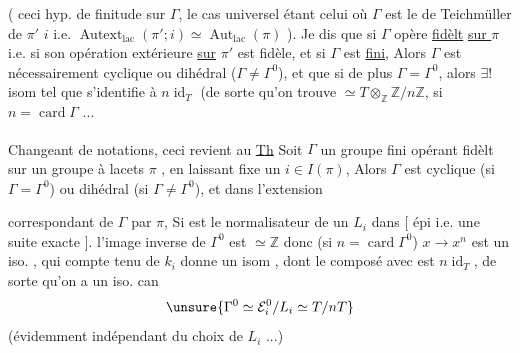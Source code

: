 ( ceci   hyp. de finitude sur
$\Gamma$, le cas universel étant celui où $\Gamma$
est le  de Teichmüller de $\pi'$  $i$
i.e. $\operatorname{Autext}_{\mathrm{lac}}(\pi';i)\simeq\operatorname{Aut}_{\mathrm{lac}}(\pi)$ ). Je
dis que si $\Gamma$ opère \uline{fidèlt} \uline{sur $\pi$}
i.e. si son opération extérieure \uline{sur}
\uline{$\pi'$} est fidèle, et si $\Gamma$ est \uline{fini},
Alors $\Gamma$ est nécessairement cyclique 
ou dihédral ($\Gamma\ne\Gamma^0$), et que si de
plus $\Gamma=\Gamma^0$, alors   $\exists!$ isom
 tel que  s'identifie à
$n\operatorname{id}_T$ (de sorte qu'on trouve 
$\simeq T\otimes_{\mathbb Z}\mathbb Z/n\mathbb Z$, si $n=\operatorname{card}\Gamma$ ...

Changeant de notations, ceci revient au
\uline{Th}\textsuperscript{} Soit $\Gamma$ un groupe fini opérant
fidèlt sur un groupe \uline{} à
lacets $\pi$ , en laissant fixe un $i\in I(\pi)$,
Alors $\Gamma$ est cyclique (si $\Gamma=\Gamma^0$) ou
dihédral (si $\Gamma\ne\Gamma^0$), et dans l'extension


correspondant   de $\Gamma$ par $\pi$,
Si  est le normalisateur de un $L_i$ dans
 [    épi i.e. une suite exacte
 ]. l'image inverse  de
$\Gamma^0$ est $\simeq\mathbb Z$ donc (si $n=\operatorname{card}\Gamma^0$)\inserted{\unsure{$=[\mathcal E_i^0:L_i]$}}
 $x\to x^n$ est un iso.  , qui
compte tenu de $k_i$ donne un
isom , dont le composé avec
  est $n\operatorname{id}_T$, de sorte
qu'on a un iso. can
\[\unsure{\Gamma^0\simeq\mathcal E_i^0/L_i\simeq T/nT}\]
(évidemment indépendant du choix de $L_i$ ...)

